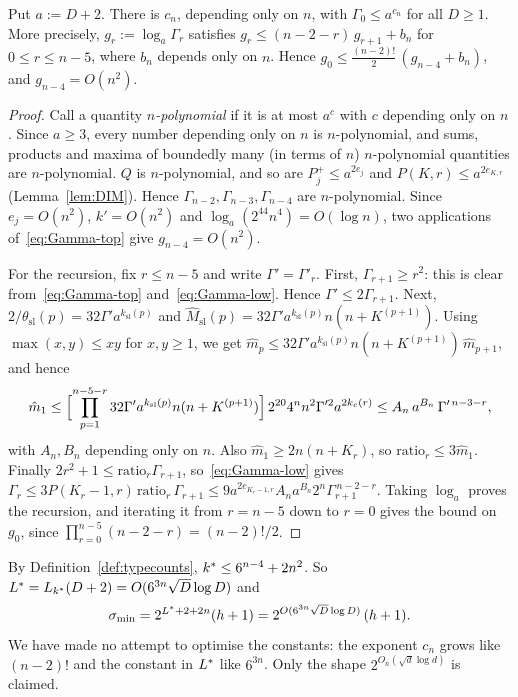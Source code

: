\begin{lemma}[growth]\label{lem:growth}
Put $a:=D+2$. There is $c_n$, depending only on $n$, with $\Gamma_0\le a^{c_n}$ for all $D\ge1$. More precisely,
$g_r:=\log_a\Gamma_r$ satisfies $g_r\le(n-2-r)\,g_{r+1}+b_n$ for $0\le r\le n-5$, where $b_n$ depends only on $n$. Hence
$g_0\le\frac{(n-2)!}2\,(g_{n-4}+b_n)$, and $g_{n-4}=O(n^2)$.
\end{lemma}
\begin{proof}
Call a quantity \emph{$n$-polynomial} if it is at most $a^c$ with $c$ depending only on $n$. Since $a\ge3$, every number
depending only on $n$ is $n$-polynomial, and sums, products and maxima of boundedly many (in terms of $n$)
$n$-polynomial quantities are $n$-polynomial. $Q$ is $n$-polynomial, and so are $P^+_j\le a^{2e_j}$ and
$P(K,r)\le a^{2e_{K,r}}$ (Lemma~\ref{lem:DIM}). Hence $\Gamma_{n-2},\Gamma_{n-3},\Gamma_{n-4}$ are $n$-polynomial. Since $e_j=O(n^2)$, $k'=O(n^2)$ and
$\log_a(2^{44}n^4)=O(\log n)$, two applications of~\eqref{eq:Gamma-top} give $g_{n-4}=O(n^2)$.

For the recursion, fix $r\le n-5$ and write $\Gamma'=\Gamma'_r$. First, $\Gamma_{r+1}\ge r^2$: this is clear from~\eqref{eq:Gamma-top}
and~\eqref{eq:Gamma-low}. Hence $\Gamma'\le2\Gamma_{r+1}$. Next, $2/\theta_{\mathrm{sl}}(p)=32\Gamma'a^{k_{\mathrm{sl}}(p)}$ and
$\hat M_{\mathrm{sl}}(p)=32\Gamma'a^{k_{\mathrm{sl}}(p)}n(n+K^{(p+1)})$. Using $\max(x,y)\le xy$ for $x,y\ge1$, we get
$\hat m_p\le32\Gamma'a^{k_{\mathrm{sl}}(p)}n(n+K^{(p+1)})\,\hat m_{p+1}$, and hence
\[
\hat m_1\le\Bigl[\prod_{p=1}^{n-5-r}32\Gamma'a^{k_{\mathrm{sl}}(p)}n(n+K^{(p+1)})\Bigr]\,2^{20}4^nn^2\Gamma'^2a^{2k_c(r)}
\le A_n\,a^{B_n}\,\Gamma'^{\,n-3-r},
\]
with $A_n,B_n$ depending only on $n$. Also $\hat m_1\ge2n(n+K_r)$, so ${\mathrm{ratio}}_r\le3\hat m_1$. Finally
$2r^2+1\le{\mathrm{ratio}}_r\Gamma_{r+1}$, so~\eqref{eq:Gamma-low} gives
$\Gamma_r\le3P(K_r-1,r)\,{\mathrm{ratio}}_r\,\Gamma_{r+1}\le9a^{2e_{K_r-1,r}}A_na^{B_n}2^{n}\Gamma_{r+1}^{\,n-2-r}$. Taking $\log_a$
proves the recursion, and iterating it from $r=n-5$ down to $r=0$ gives the bound on $g_0$, since
$\prod_{r=0}^{n-5}(n-2-r)=(n-2)!/2$.
\end{proof}

By Definition~\ref{def:typecounts}, $k^{\ast}\le6^{n-4}+2n^2$. So $L^{\ast}=L_{k^{\ast}}(D+2)=O(6^{3n}\sqrt D\log D)$ and
\[
\sigma_{\min}=2^{L^{\ast}+2+2n}(h+1)=2^{O(6^{3n}\sqrt D\log D)}\,(h+1).
\]
We have made no attempt to optimise the constants: the exponent $c_n$ grows like $(n-2)!$ and the constant in
$L^{\ast}$ like $6^{3n}$. Only the shape $2^{O_n(\sqrt d\log d)}$ is claimed.

